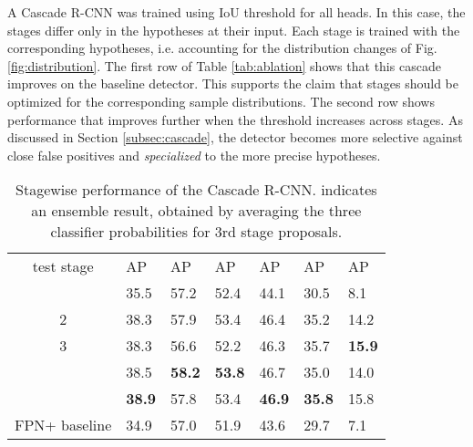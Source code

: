 \documentclass[10pt,journal,compsoc]{IEEEtran}
\newcommand{\bd}[1]{\textbf{#1}}
\newcommand{\tablestyle}[2]{\setlength{\tabcolsep}{#1}\renewcommand{\arraystretch}{#2}\centering\footnotesize}
\begin{document}
\vspace{0.2cm}
A Cascade R-CNN was trained using IoU threshold 
for all heads. In this case, the stages differ only in the hypotheses
at their input. Each stage is trained with the corresponding hypotheses, i.e.
accounting for the distribution changes of Fig. \ref{fig:distribution}.
The first row of Table \ref{tab:ablation} shows that this cascade improves
on the baseline detector. This supports the claim that stages should be
optimized for the corresponding sample distributions.
The second row shows performance that improves further when
the threshold  increases across stages.
As discussed in Section \ref{subsec:cascade}, the detector
becomes more selective against close false positives and
{\it specialized\/} to the more precise hypotheses.

\begin{table}[t]
\tablestyle{1.8pt}{1.2}
\begin{tabular}{c|x{22}|x{22}x{22}x{22}x{22}x{22}}
test stage & AP & AP & AP &AP &AP &AP\\ [.1em] &35.5 &57.2  &52.4 &44.1 &30.5  &8.1\\
2 &38.3 &57.9  &53.4 &46.4 &35.2  &14.2\\
3 &38.3 &56.6  &52.2 &46.3 &35.7  &\bd{15.9}\\
 &38.5 &\bd{58.2}  &\bd{53.8} &46.7 &35.0  &14.0\\
 &\bd{38.9} &57.8  &53.4 &\bd{46.9} &\bd{35.8}  &15.8\\\hline
FPN+ baseline &34.9 &57.0  &51.9 &43.6 &29.7  &7.1\\
\end{tabular}\vspace{2mm}
\caption{Stagewise performance of the Cascade R-CNN. 
indicates an ensemble result, obtained by averaging the three classifier
probabilities for 3rd stage proposals.}
\label{tab:stage performance}\vspace{-3mm}
\end{table}
\end{document}
